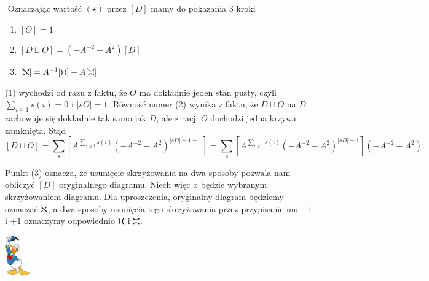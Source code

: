 \documentclass{article}
\renewenvironment{proof}{{\bfseries\color{orange} Dowód}$ $\newline}{
  \begin{flushright}\includegraphics[width=30pt]{Donald_Duck.png}\end{flushright}$ $\newline
}
\begin{document}
\def\lewoprawo{\tikz[baseline=.1ex]{
    \draw[thick] (0,0)..controls(.5ex, .25ex)and(.5ex, 1.25ex)..(0,1.5ex);
    \draw[thick] (1.5ex,0)..controls(1ex, .25ex)and(1ex, 1.25ex)..(1.5ex,1.5ex);
  }
}

\def\goradol{\tikz[baseline=.1ex]{
    \draw[thick] (0,0)..controls(.25ex, .5ex)and(1.25ex, .5ex)..(1.5ex,0);
    \draw[thick] (0,1.5ex)..controls(.25ex, 1ex)and(1.25ex, 1ex)..(1.5ex,1.5ex);
  }
}

\begin{proof}
  Oznaczając wartość $(\star)$ przez $[D]$ mamy do pokazania $3$ kroki
  \begin{enumerate}
    \item $[O]=1$
    \item $[D\sqcup O]=(-A^{-2}-A^2)[D]$
    \item $[\iksik]=A^{-1}[\lewoprawo]+A[\goradol]$
  \end{enumerate}

  (1) wychodzi od razu z faktu, że $O$ ma dokładnie jeden stan pusty, czyli $\sum_{i\geq 1}s(i)=0$ i $|sO|=1$. Równość numer (2) wynika z faktu, że $D\sqcup O$ na $D$ zachowuje się dokładnie tak samo jak $D$, ale z racji $O$ dochodzi jedna krzywa zamknięta. Stąd 
  $$[D\sqcup O]=\sum_s\left[A^{\sum_{i\geq 1}s(i)}(-A^{-2}-A^2)^{|sD|+1-1}\right]=\sum_s\left[A^{\sum_{i\geq 1}s(i)}(-A^{-2}-A^2)^{|sD|-1}\right](-A^{-2}-A^2).$$

  Punkt (3) oznacza, że usunięcie skrzyżowania na dwa sposoby pozwala nam obliczyć $[D]$ oryginalnego diagramu. Niech więc $x$ będzie wybranym skrzyżowaniem diagramu. Dla uproszczenia, oryginalny diagram będziemy oznaczać $\iksik$, a dwa sposoby usunięcia tego skrzyżowania przez przypisanie mu $-1$ i $+1$ oznaczymy odpowiednio $\lewoprawo$ i $\goradol$.
%


\end{proof}
\end{document}
